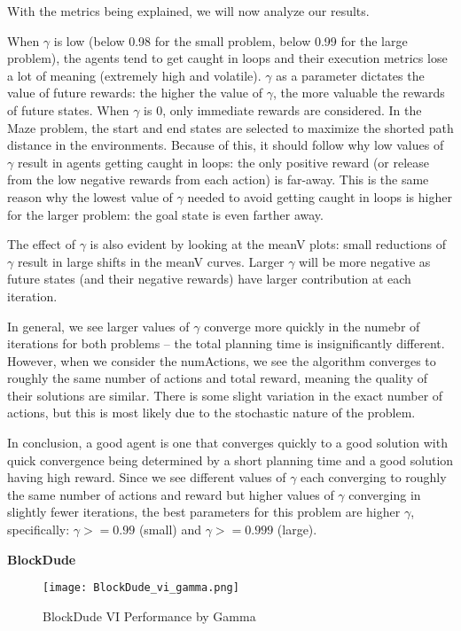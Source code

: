 \documentclass{article}
\begin{document}
With the metrics being explained, we will now analyze our results.

When $\gamma$ is low (below 0.98 for the small problem, below 0.99 for the large problem), the agents
tend to get caught in loops and their execution metrics lose a lot of meaning (extremely high and volatile).
$\gamma$ as a parameter dictates the value of future rewards: the higher the value of $\gamma$, the more
valuable the rewards of future states. When $\gamma$ is 0, only immediate rewards are considered. In the
Maze problem, the start and end states are selected to maximize the shorted path distance in the environments.
Because of this, it should follow why low values of $\gamma$ result in agents getting caught in loops: the only
positive reward (or release from the low negative rewards from each action) is far-away. This is the
same reason why the lowest value of $\gamma$ needed to avoid getting caught in loops is higher for the
larger problem: the goal state is even farther away.

The effect of $\gamma$ is also evident by looking at the meanV plots: small reductions of $\gamma$ result
in large shifts in the meanV curves. Larger $\gamma$ will be more negative as future states (and their
negative rewards) have larger contribution at each iteration.

In general, we see larger values of $\gamma$ converge more quickly in the numebr of iterations for both problems --
the total planning time is insignificantly different. However, when we consider the numActions, we see the algorithm
converges to roughly the same number of actions and total reward, meaning the quality of their solutions are similar.
There is some slight variation in the exact number of actions, but this is most likely due to the stochastic nature
of the problem.

In conclusion, a good agent is one that converges quickly to a good solution with quick convergence being determined by
a short planning time and a good solution having high reward. Since we see different values of $\gamma$ each converging
to roughly the same number of actions and reward but higher values of $\gamma$ converging in slightly fewer iterations,
the best parameters for this problem are higher $\gamma$, specifically: $\gamma >= 0.99$ (small) and $\gamma >= 0.999$ (large).

\textbf{BlockDude}

\begin{figure}
    \centering
    \label{fig:DT-ccp}
    \texttt{[image: BlockDude\_vi\_gamma.png]}
    \caption{BlockDude VI Performance by Gamma}
\end{figure}
\end{document}
